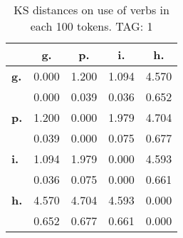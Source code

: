 \begin{table}[h!]
\begin{center}
\begin{tabular}{| l || c | c | c | c |}\hline
 & {\bf g.} & {\bf p.} & {\bf i.} & {\bf h.} \\\hline\hline
{\bf g.} & 0.000 & 1.200 & 1.094 & 4.570 \\
{\bf } & 0.000 & 0.039 & 0.036 & 0.652 \\\hline
{\bf p.} & 1.200 & 0.000 & 1.979 & 4.704 \\
{\bf } & 0.039 & 0.000 & 0.075 & 0.677 \\\hline
{\bf i.} & 1.094 & 1.979 & 0.000 & 4.593 \\
{\bf } & 0.036 & 0.075 & 0.000 & 0.661 \\\hline
{\bf h.} & 4.570 & 4.704 & 4.593 & 0.000 \\
{\bf } & 0.652 & 0.677 & 0.661 & 0.000 \\\hline
\end{tabular}
\caption{KS distances on use of verbs in each 100 tokens. TAG: 1}
\end{center}
\end{table}